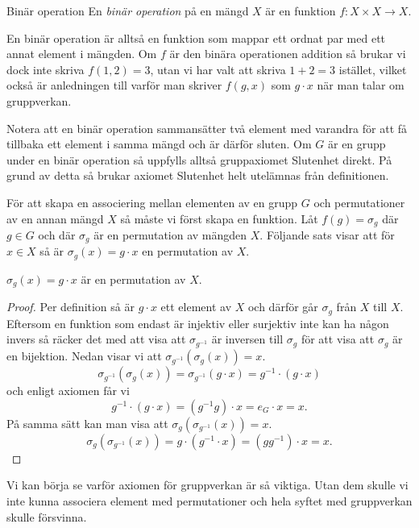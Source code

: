 \documentclass{article}
\theoremstyle{definition}
\begin{document}
\begin{mydef}{Binär operation}{}
  En \textit{binär operation} på en mängd $X$ är en funktion $f: X \times X \rightarrow X$. 
\end{mydef}
En binär operation är alltså en funktion som mappar ett ordnat par med ett annat element 
i mängden. Om $f$ är den binära operationen addition så brukar vi dock inte skriva 
$f(1, 2) = 3$, utan vi har valt att skriva $1 + 2 = 3$ istället, vilket också 
är anledningen till varför man skriver $f(g, x)$ som $g \cdot x$ när man talar om gruppverkan. 

Notera att en binär operation sammansätter två element med varandra för att få tillbaka 
ett element i samma mängd och är därför sluten. Om $G$ är en grupp under en binär operation 
så uppfylls alltså gruppaxiomet Slutenhet direkt. På grund av detta så brukar 
axiomet Slutenhet helt utelämnas från definitionen. 

För att skapa en associering mellan elementen av en grupp $G$ och permutationer av 
en annan mängd $X$ så måste vi först skapa en funktion.
Låt $f(g) = \sigma_g$ där 
$g \in G$ och där $\sigma_g$ är en permutation av mängden $X$. Följande sats visar 
att för $x \in X$ så är $\sigma_g(x) = g \cdot x$ en permutation av $X$. 

\hypertarget{sats4.9.1}{}
\begin{mytheo}{}{}
  $\sigma_g(x) = g \cdot x$ är en permutation av $X$.
\end{mytheo}
\begin{proof}
  Per definition så är $g \cdot x$ ett element av $X$ och därför går $\sigma_g$ från 
  $X$ till $X$. Eftersom en funktion som endast är injektiv eller surjektiv inte kan ha någon invers 
  så räcker det med att visa att $\sigma_{g^{-1}}$ är inversen till $\sigma_g$ 
  för att visa att $\sigma_g$ är en 
  bijektion. Nedan visar vi att $\sigma_{g^{-1}}(\sigma_g(x)) = x.$
  \[\sigma_{g^{-1}}(\sigma_g(x)) = \sigma_{g^{-1}}(g \cdot x) = g^{-1} \cdot (g \cdot x)\]
  och enligt axiomen får vi
  \[g^{-1} \cdot (g \cdot x) = (g^{-1}g) \cdot x = e_G \cdot x = x.\]
  På samma sätt kan man visa att $\sigma_g(\sigma_{g^{-1}}(x)) = x.$
  \[\sigma_g(\sigma_{g^{-1}}(x)) = g \cdot (g^{-1} \cdot x) = (g g^{-1}) \cdot x = x.\]
\end{proof}
Vi kan börja se varför axiomen för gruppverkan är så viktiga. Utan dem skulle vi inte 
kunna associera element med permutationer och hela syftet med gruppverkan skulle försvinna. 
\end{document}
